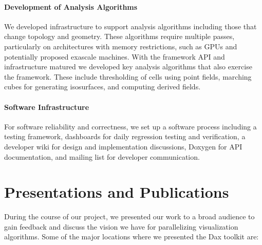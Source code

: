\paragraph*{Development of Analysis Algorithms}

We developed infrastructure to support analysis algorithms including those
that change topology and geometry. These algorithms require multiple
passes, particularly on architectures with memory restrictions, such as
GPUs and potentially proposed exascale machines. With the framework API and
infrastructure matured we developed key analysis algorithms that also
exercise the framework. These include thresholding of cells using point
fields, marching cubes for generating isosurfaces, and computing derived
fields.

\paragraph*{Software Infrastructure}

For software reliability and correctness, we set up a software process
including a testing framework, dashboards for daily regression testing and
verification, a developer wiki for design and implementation discussions,
Doxygen for API documentation, and mailing list for developer
communication.


\section*{Presentations and Publications}

During the course of our project, we presented our work to a broad audience
to gain feedback and discuss the vision we have for parallelizing
visualization algorithms. Some of the major locations where we presented
the Dax toolkit are:

